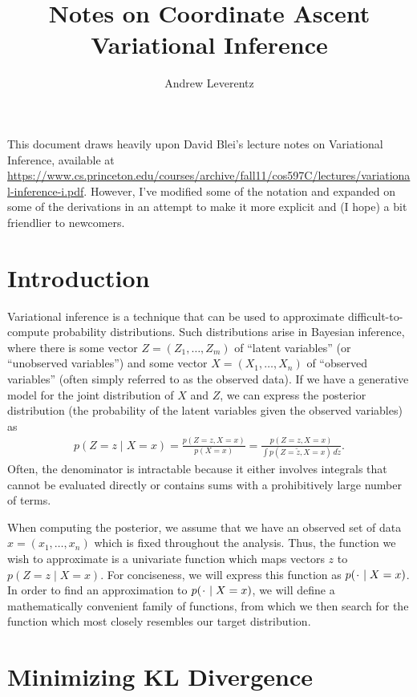 \documentclass[11pt]{article}
\title{Notes on Coordinate Ascent Variational Inference}
\author{Andrew Leverentz}
\date{}
\newcommand*{\placeholder}{\makebox[1ex]{$\cdot$}}
\begin{document}
\maketitle

\begin{sloppypar}
This document draws heavily upon David Blei's lecture notes on Variational Inference, available at \url{https://www.cs.princeton.edu/courses/archive/fall11/cos597C/lectures/variational-inference-i.pdf}.
However, I've modified some of the notation and expanded on some of the derivations in an attempt to make it more explicit and (I hope) a bit friendlier to newcomers.
\end{sloppypar}

\section{Introduction}

Variational inference is a technique that can be used to approximate difficult-to-compute probability distributions.
Such distributions arise in Bayesian inference, where there is some vector $Z = (Z_1, \ldots, Z_m)$ of ``latent variables'' (or ``unobserved variables'') and some vector $X = (X_1, \ldots, X_n)$ of ``observed variables'' (often simply referred to as the observed data).
If we have a generative model for the joint distribution of $X$ and $Z$, we can express the posterior distribution (the probability of the latent variables given the observed variables) as
\begin{align}
p(Z = z \mid X = x) = \frac{p(Z=z, X=x)}{p(X=x)} = \frac{p(Z=z, X=x)}{\int p(Z = \tilde{z}, X = x) \, d\tilde{z}}.
\end{align}
Often, the denominator is intractable because it either involves integrals that cannot be evaluated directly or contains sums with a prohibitively large number of terms.

When computing the posterior, we assume that we have an observed set of data $x = (x_1, \ldots, x_n)$ which is fixed throughout the analysis.
Thus, the function we wish to approximate is a univariate function which maps vectors $z$ to $p(Z = z \mid X = x)$.
For conciseness, we will express this function as $p(\placeholder \mid X = x)$.
In order to find an approximation to $p(\placeholder \mid X = x)$, we will define a mathematically convenient family of functions, from which we then search for the function which most closely resembles our target distribution.

\section{Minimizing KL Divergence}
\end{document}

